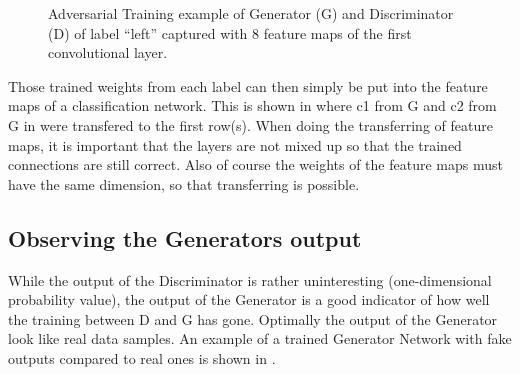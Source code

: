 \begin{figure}[!ht]
  \centering
  \caption{Adversarial Training example of Generator (G) and Discriminator (D) of label \enquote{left} captured with 8 feature maps of the first convolutional layer.}
  \label{fig:nn_adv_example_label}
\end{figure}
\FloatBarrier
\noindent

Those trained weights from each label can then simply be put into the feature maps of a classification network.
This is shown in  where c1 from G and c2 from G in  were transfered to the first row(s).
When doing the transferring of feature maps, it is important that the layers are not mixed up so that the trained connections are still correct.
Also of course the weights of the feature maps must have the same dimension, so that transferring is possible.


\subsection{Observing the Generators output}
While the output of the Discriminator is rather uninteresting (one-dimensional probability value), the output of the Generator is a good indicator of how well the training between D and G has gone.
Optimally the output of the Generator look like real data samples.
An example of a trained Generator Network with fake outputs compared to real ones is shown in .

